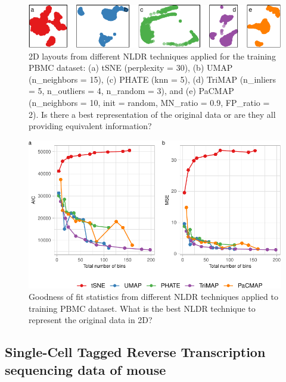 \documentclass[
  12pt]{article}
\begin{document}
\begin{figure}

{\centering \includegraphics[width=1\textwidth,height=\textheight]{paper_files/figure-pdf/fig-nldervis5PBMC-1.pdf}

}

\caption{\label{fig-nldervis5PBMC}2D layouts from different NLDR
techniques applied for the training PBMC dataset: (a) tSNE (perplexity =
30), (b) UMAP (n\_neighbors = 15), (c) PHATE (knn = 5), (d) TriMAP
(n\_inliers = 5, n\_outliers = 4, n\_random = 3), and (e) PaCMAP
(n\_neighbors = 10, init = random, MN\_ratio = 0.9, FP\_ratio = 2). Is
there a best representation of the original data or are they all
providing equivalent information?}

\end{figure}

\begin{figure}

{\centering \includegraphics[width=1\textwidth,height=\textheight]{paper_files/figure-pdf/fig-diagnosticpltPBMC-1.pdf}

}

\caption{\label{fig-diagnosticpltPBMC}Goodness of fit statistics from
different NLDR techniques applied to training PBMC dataset. What is the
best NLDR technique to represent the original data in 2D?}

\end{figure}

\hypertarget{single-cell-tagged-reverse-transcription-sequencing-data-of-mouse}{%
\subsection{Single-Cell Tagged Reverse Transcription sequencing data of
mouse}\label{single-cell-tagged-reverse-transcription-sequencing-data-of-mouse}}
\end{document}
